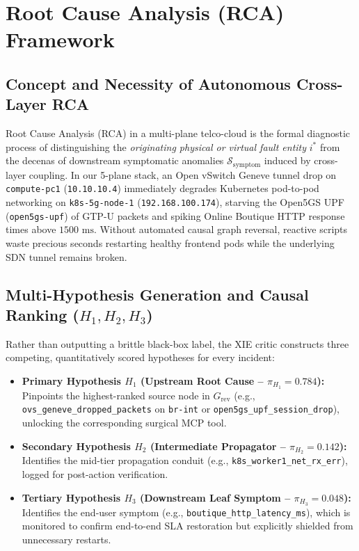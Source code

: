 \section{Root Cause Analysis (RCA) Framework}

\subsection*{Concept and Necessity of Autonomous Cross-Layer RCA}
Root Cause Analysis (RCA) in a multi-plane telco-cloud is the formal diagnostic process of distinguishing the \textit{originating physical or virtual fault entity} $i^*$ from the decenas of downstream symptomatic anomalies $\mathcal{S}_{\text{symptom}}$ induced by cross-layer coupling. In our 5-plane stack, an Open vSwitch Geneve tunnel drop on \texttt{compute-pc1} (\texttt{10.10.10.4}) immediately degrades Kubernetes pod-to-pod networking on \texttt{k8s-5g-node-1} (\texttt{192.168.100.174}), starving the Open5GS UPF (\texttt{open5gs-upf}) of GTP-U packets and spiking Online Boutique HTTP response times above $1500\text{ ms}$. Without automated causal graph reversal, reactive scripts waste precious seconds restarting healthy frontend pods while the underlying SDN tunnel remains broken.

\subsection*{Multi-Hypothesis Generation and Causal Ranking ($H_1, H_2, H_3$)}
Rather than outputting a brittle black-box label, the XIE critic constructs three competing, quantitatively scored hypotheses for every incident:
\begin{itemize}
    \item \textbf{Primary Hypothesis $H_1$ (Upstream Root Cause -- $\pi_{H_1} = 0.784$):} Pinpoints the highest-ranked source node in $G_{\text{rev}}$ (e.g., \texttt{ovs\_geneve\_dropped\_packets} on \texttt{br-int} or \texttt{open5gs\_upf\_session\_drop}), unlocking the corresponding surgical MCP tool.
    \item \textbf{Secondary Hypothesis $H_2$ (Intermediate Propagator -- $\pi_{H_2} = 0.142$):} Identifies the mid-tier propagation conduit (e.g., \texttt{k8s\_worker1\_net\_rx\_err}), logged for post-action verification.
    \item \textbf{Tertiary Hypothesis $H_3$ (Downstream Leaf Symptom -- $\pi_{H_3} = 0.048$):} Identifies the end-user symptom (e.g., \texttt{boutique\_http\_latency\_ms}), which is monitored to confirm end-to-end SLA restoration but explicitly shielded from unnecessary restarts.
\end{itemize}


